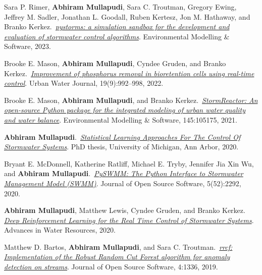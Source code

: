 \documentclass[a4paper,11pt]{article}
\newcommand{\years}[1]{%
  {\reversemarginpar\strut\marginnote{{\small#1}}}%
}
\begin{document}
\years{2023} Sara P. Rimer, \textbf{Abhiram Mullapudi}, Sara C. Troutman, Gregory Ewing, Jeffrey M. Sadler, Jonathan L. Goodall, Ruben Kertesz, Jon M. Hathaway, and Branko Kerkez.\ \href{https://www.sciencedirect.com/science/article/abs/pii/S136481522300021X}{\emph{pystorms: a simulation sandbox for the development and evaluation of stormwater control algorithms}}. Environmental Modelling \& Software, 2023.\\[.1cm]

\years{2022} Brooke E. Mason, \textbf{Abhiram Mullapudi}, Cyndee Gruden, and Branko Kerkez.\ \href{https://www.tandfonline.com/doi/abs/10.1080/1573062X.2022.2108464}{\emph{Improvement of phosphorus removal in bioretention cells using real-time control}}. Urban Water Journal, 19(9):992–998, 2022.\\[.1cm]


\years{2021} Brooke E. Mason, \textbf{Abhiram Mullapudi}, and Branko Kerkez.\ \href{https://www.sciencedirect.com/science/article/abs/pii/S1364815221002176}{\emph{StormReactor: An open-source Python package for the integrated modeling of urban water quality and water balance}}. Environmental Modelling \& Software, 145:105175, 2021.\\[.1cm]


\years{2020} \textbf{Abhiram Mullapudi}.\ \href{https://github.com/abhiramm7/UofM-Doc-Thesis/blob/master/Dissertation_Abhi.pdf}{\emph{Statistical Learning Approaches For The Control Of Stormwater Systems}}. PhD thesis, University of Michigan, Ann Arbor, 2020.\\[.1cm]


\years{2020}  Bryant E. McDonnell, Katherine Ratliff, Michael E. Tryby, Jennifer Jia Xin Wu,
and \textbf{Abhiram Mullapudi}.\ \href{https://joss.theoj.org/papers/10.21105/joss.02292.pdf}{\emph{PySWMM: The Python Interface to Stormwater Management Model (SWMM)}}. Journal of Open Source Software, 5(52):2292, 2020.\\[.1cm]


\years{2020}  \textbf{Abhiram Mullapudi}, Matthew Lewis, Cyndee Gruden, and Branko Kerkez.
\href{http://www.sciencedirect.com/science/article/pii/S0309170820302499}{\emph{Deep Reinforcement Learning for the Real Time Control of Stormwater Systems}}. Advances in Water Resources, 2020.\\[.1cm]


\years{2019} Matthew D. Bartos, \textbf{Abhiram Mullapudi}, and Sara C. Troutman.\ \href{https://joss.theoj.org/papers/10.21105/joss.01336}{\emph{rrcf: Implementation of the Robust Random Cut Forest algorithm for anomaly detection on streams}}. Journal of Open Source Software, 4:1336, 2019.\\[.1cm]
\end{document}
